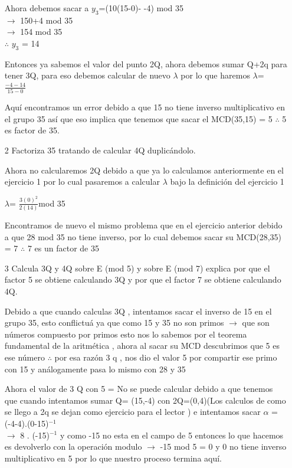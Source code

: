 \documentclass[10pt,a4paper]{article}
\begin{document}
\begin{itemize}
 Ahora debemos sacar a $y_3$=(10(15-0)- -4) mod 35 \\
 $\rightarrow$ 150+4 mod 35\\
 $\rightarrow$ 154 mod 35\\
$\therefore$ $y_3$ = 14  

Entonces ya sabemos el valor del punto 2Q, ahora debemos sumar Q+2q para tener 3Q, para eso debemos calcular de nuevo $\lambda$ por lo que haremos\vspace{.3cm}
$\lambda$= $\frac{-4-14} {15-0}$\vspace{.3cm}

Aquí encontramos un error debido a que 15 no tiene inverso multiplicativo en el grupo 35 así que eso implica que tenemos que sacar el MCD(35,15) = 5 $\therefore$ 5 es factor de 35.

\item[2] Factoriza 35 tratando de calcular 4Q duplicándolo.

Ahora no calcularemos 2Q debido a que ya lo calculamos anteriormente en el ejercicio 1 por lo cual pasaremos a calcular $\lambda$ bajo la definición del ejercicio 1\vspace{.3cm} 

$\lambda$= $\frac{3(0)^2}{2(14)}$mod 35 \vspace{.3cm}

Encontramos de nuevo el mismo problema que en el ejercicio anterior debido a que 28 mod 35  no tiene inverso, por lo cual debemos sacar su MCD(28,35) = 7 $\therefore$ 7 es un factor de 35 

\item[3] Calcula 3Q y 4Q sobre E (mod 5) y sobre E (mod 7) explica por que el factor 5
se obtiene calculando 3Q y por que el factor 7 se obtiene calculando 4Q.

Debido a que cuando calculas 3Q , intentamos sacar el inverso de 15 en el grupo 35, esto conflictuá ya que como 15 y 35 no son primos $\rightarrow$ que son números compuesto por primos esto nos lo sabemos por el teorema fundamental de la aritmética , ahora al sacar su MCD descubrimos que 5 es ese número $\therefore$ por esa razón 3 q , nos dio el valor 5 por compartir ese primo con 15 y análogamente pasa lo mismo con 28 y 35 

Ahora el valor de 3 Q con 5 =  No se puede calcular debido a que tenemos que cuando intentamos sumar Q= (15,-4) con 2Q=(0,4)(Los calculos de como se llego a 2q  se dejan como ejercicio para el lector ) e intentamos sacar $\alpha$ = (-4-4).(0-15)$^{-1}$\\
$\rightarrow$ 8 . (-15)$^{-1}$ y como -15 no esta en el campo de 5 entonces lo que hacemos es devolverlo con la operación modulo $\rightarrow$ -15 mod 5 = 0 y 0 no tiene inverso multiplicativo en 5  por lo que nuestro proceso termina aquí.\vspace{.3cm}


\end{itemize}
\end{document}
